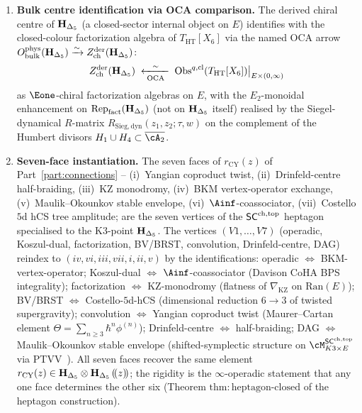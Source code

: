 \begin{proposition}
\begin{enumerate}[label=\textup{(\alph*)}]
The chiral product $\mu^{\mathrm{ch}}_{\HDelta}$ is the restriction
of the bulk closed-colour holomorphic factorization
$\mu^{\mathrm{hol},\mathrm{bulk}}_\Delta$ (Theorem
\texttt{thm:bulk-boundary-OPE-consistency} of
the heptagon construction\,\S 3, the
Costello--Gwilliam OPE compatibility at chain level).
\item \textbf{Bulk centre identification via OCA comparison.} The derived
chiral centre of $\mathbf{H}_{\Delta_5}$ (a closed-sector internal object on
$E$) identifies with the closed-colour factorization algebra of
$T_{\mathrm{HT}}[X_6]$ via the named OCA arrow
$O^{\mathrm{phys}}_{\mathrm{bulk}}(\mathbf{H}_{\Delta_5}) \xrightarrow{\sim}
Z^{\mathrm{der}}_{\mathrm{ch}}(\mathbf{H}_{\Delta_5})$:
\begin{equation}
 \label{eq:qgfnd-clp-derived-centre-bulk}
 Z^{\mathrm{der}}_{\mathrm{ch}}(\mathbf{H}_{\Delta_5})
 \;\xleftarrow[\;\mathrm{OCA}\;]{\;\sim\;}\;
 \mathrm{Obs}^{q,\mathrm{cl}}(T_{\mathrm{HT}}[X_6])\bigl|_{E\times(0,\infty)}
\end{equation}
as $\Eone$-chiral factorization algebras on $E$, with the
$E_2$-monoidal enhancement on $\mathrm{Rep}_{\mathrm{fact}}(\mathbf{H}_{\Delta_5})$
(not on $\mathbf{H}_{\Delta_5}$ itself) realised
by the Siegel-dynamical $R$-matrix
$R_{\mathrm{Sieg,dyn}}(z_1,z_2;\tau,w)$ on the complement of the
Humbert divisors $H_1\cup H_4\subset\overline{\cA_2}$.
\item \textbf{Seven-face instantiation.} The seven faces of
$r_{\mathrm{CY}}(z)$ of Part~\ref{part:connections} --
(i)~Yangian coproduct twist,
(ii)~Drinfeld-centre half-braiding, (iii)~KZ monodromy,
(iv)~BKM vertex-operator exchange, (v)~Maulik--Okounkov stable
envelope, (vi)~$\Ainf$-coassociator, (vii)~Costello $5$d hCS tree
amplitude; are the seven vertices of the $\mathsf{SC}^{\mathrm{ch,top}}$ heptagon
specialised to the K3-point $\mathbf{H}_{\Delta_5}$. The
vertices $(V1,\ldots,V7)$ (operadic, Koszul-dual, factorization,
BV/BRST, convolution, Drinfeld-centre, DAG) reindex to
$(iv, vi, iii, vii, i, ii, v)$ by the identifications:
operadic $\Leftrightarrow$ BKM-vertex-operator;
Koszul-dual $\Leftrightarrow$ $\Ainf$-coassociator (Davison CoHA
BPS integrality);
factorization $\Leftrightarrow$ KZ-monodromy (flatness of
$\nabla_{\mathrm{KZ}}$ on $\mathrm{Ran}(E)$);
BV/BRST $\Leftrightarrow$ Costello-$5$d-hCS (dimensional reduction
$6\to 3$ of twisted supergravity);
convolution $\Leftrightarrow$ Yangian coproduct twist (Maurer--Cartan
element $\Theta=\sum_{n\geq 3}\hbar^n\phi^{(n)}$);
Drinfeld-centre $\Leftrightarrow$ half-braiding;
DAG $\Leftrightarrow$ Maulik--Okounkov stable envelope
(shifted-symplectic structure on $\cM^{\SCchtop}_{K3\times E}$
via PTVV~\cite{PTVV13}).
All seven faces recover the same element $r_{\mathrm{CY}}(z)\in
\mathbf{H}_{\Delta_5}\otimes\mathbf{H}_{\Delta_5}\,(\!(z)\!)$; the rigidity is the
$\infty$-operadic statement that any one face determines the other
six (Theorem $\mathrm{thm:heptagon\text{-}closed}$ of
the heptagon construction).
\end{enumerate}
\end{proposition}

